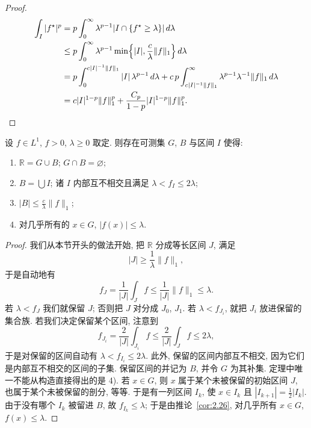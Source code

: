 \begin{proof}
\begin{align*}
\int_{I}|f^{\star}|^{p}&=p\int_{0}^{\infty}\lambda^{p-1}|I\cap\{f^{\star}\geq\lambda\}|\,d\lambda \\
&\leq p\int_{0}^{\infty}\lambda^{p-1}\min\Bigl\{|I|,\frac{c}{\lambda}\|f\|_{1}\Bigr\}\,d\lambda \\
&=p\int_{0}^{c|I|^{-1}\|f\|_{1}}|I|\,\lambda^{p-1}\,d\lambda
+c\,p\int_{c|I|^{-1}\|f\|_{1}}^{\infty}\lambda^{p-1}\lambda^{-1}\|f\|_{1}\,d\lambda \\
&=c|I|^{1-p}\|f\|_{1}^{p}+\frac{C_{p}}{1-p}|I|^{1-p}\|f\|_{1}^{p}. \qedhere
\end{align*}
\end{proof}

\begin{theorem}\label{thm:2.28}
设 $f\in L^1$, $f>0$, $\lambda\geq 0$ 取定. 则存在可测集 $G$, $B$ 与区间 $I$ 使得:
\begin{enumerate}[label=\arabic*)]
\item $\mathbb{R}=G\cup B$; $G\cap B=\varnothing$;
\item $B=\bigcup I$; 诸 $I$ 内部互不相交且满足 $\lambda<f_I\leq 2\lambda$;
\item $|B|\leq\frac{c}{\lambda}\|f\|_1$;
\item 对几乎所有的 $x\in G$, $|f(x)|\leq\lambda$.
\end{enumerate}
\end{theorem}

\begin{proof}
我们从本节开头的做法开始, 把 $\mathbb{R}$ 分成等长区间 $J$, 满足
\[
|J|\geq\frac{1}{\lambda}\|f\|_{1},
\]
于是自动地有
\[
f_{J}=\frac{1}{|J|}\int_{J}f\leq\frac{1}{|J|}\|f\|_{1}\leq\lambda.
\]
若 $\lambda<f_J$ 我们就保留 $J$; 否则把 $J$ 对分成 $J_0$, $J_1$. 若 $\lambda<f_{J_i}$, 就把 $J_i$ 放进保留的集合族. 若我们决定保留某个区间, 注意到
\[
f_{J_{i}}=\frac{2}{\left|J\right|}\int_{J_{i}}f
\leq\frac{2}{\left|J\right|}\int_{J}f\leq 2\lambda,
\]
于是对保留的区间自动有 $\lambda<f_{I_i}\leq 2\lambda$. 此外, 保留的区间内部互不相交, 因为它们是内部互不相交的区间的子集. 保留区间的并记为 $B$, 并令 $G$ 为其补集. 定理中唯一不能从构造直接得出的是 4). 若 $x\in G$, 则 $x$ 属于某个未被保留的初始区间 $J$, 也属于某个未被保留的剖分, 等等. 于是有一列区间 $I_k$, 使 $x\in I_k$ 且 $|I_{k+1}|=\frac{1}{2}|I_k|$. 由于没有哪个 $I_k$ 被留进 $B$, 故 $f_{I_k}\leq\lambda$; 于是由推论~\ref{cor:2.26}, 对几乎所有 $x\in G$, $f(x)\leq\lambda$.
\end{proof}

